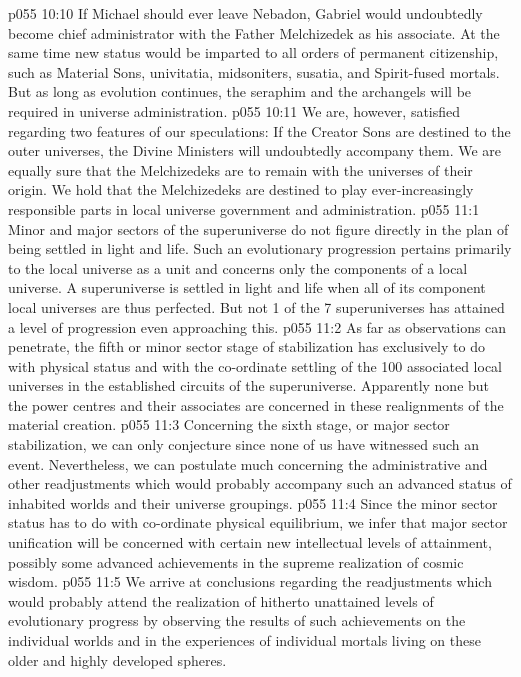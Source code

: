 \vs p055 10:10 If Michael should ever leave Nebadon, Gabriel would undoubtedly become chief administrator with the Father Melchizedek as his associate. At the same time new status would be imparted to all orders of permanent citizenship, such as Material Sons, univitatia, midsoniters, susatia, and Spirit\hyp{}fused mortals. But as long as evolution continues, the seraphim and the archangels will be required in universe administration.
\vs p055 10:11 We are, however, satisfied regarding two features of our speculations: If the Creator Sons are destined to the outer universes, the Divine Ministers will undoubtedly accompany them. We are equally sure that the Melchizedeks are to remain with the universes of their origin. We hold that the Melchizedeks are destined to play ever\hyp{}increasingly responsible parts in local universe government and administration.
\vs p055 11:1 Minor and major sectors of the superuniverse do not figure directly in the plan of being settled in light and life. Such an evolutionary progression pertains primarily to the local universe as a unit and concerns only the components of a local universe. A superuniverse is settled in light and life when all of its component local universes are thus perfected. But not 1 of the 7 superuniverses has attained a level of progression even approaching this.
\vs p055 11:2 \pc {} As far as observations can penetrate, the fifth or minor sector stage of stabilization has exclusively to do with physical status and with the co\hyp{}ordinate settling of the 100 associated local universes in the established circuits of the superuniverse. Apparently none but the power centres and their associates are concerned in these realignments of the material creation.
\vs p055 11:3 \pc {} Concerning the sixth stage, or major sector stabilization, we can only conjecture since none of us have witnessed such an event. Nevertheless, we can postulate much concerning the administrative and other readjustments which would probably accompany such an advanced status of inhabited worlds and their universe groupings.
\vs p055 11:4 Since the minor sector status has to do with co\hyp{}ordinate physical equilibrium, we infer that major sector unification will be concerned with certain new intellectual levels of attainment, possibly some advanced achievements in the supreme realization of cosmic wisdom.
\vs p055 11:5 \pc We arrive at conclusions regarding the readjustments which would probably attend the realization of hitherto unattained levels of evolutionary progress by observing the results of such achievements on the individual worlds and in the experiences of individual mortals living on these older and highly developed spheres.
